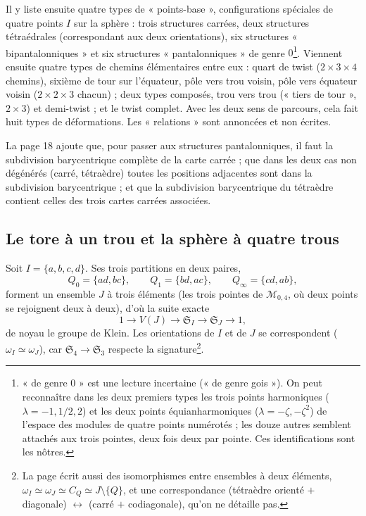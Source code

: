\documentclass[11pt,a4paper]{article}
\begin{document}
Il y liste ensuite quatre types de « points-base », configurations
spéciales de quatre points $I$ sur la sphère : trois structures carrées, deux
structures tétraédrales (correspondant aux deux orientations), six structures
« bipantalonniques » et six structures « pantalonniques » de genre
$0$\footnote{« de genre $0$ » est une lecture incertaine (« de genre gois »).
On peut reconnaître dans les deux premiers types les trois points harmoniques
($\lambda = -1, 1/2, 2$) et les deux points équianharmoniques ($\lambda = -\zeta,
-\zeta^2$) de l'espace des modules de quatre points numérotés ; les douze autres
semblent attachés aux trois pointes, deux fois deux par pointe. Ces
identifications sont les nôtres.}. Viennent ensuite quatre types de chemins élémentaires
entre eux : quart de twist ($2 \times 3 \times 4$ chemins), sixième de tour sur
l'équateur, pôle vers trou voisin, pôle vers équateur voisin ($2 \times 2 \times
3$ chacun) ; deux types composés, trou vers trou (« tiers de tour », $2 \times
3$) et demi-twist ; et le twist complet. Avec les deux sens de parcours, cela
fait huit types de déformations. Les « relations » sont annoncées et non
écrites.

La page 18 ajoute que, pour passer aux structures pantalonniques, il faut la
subdivision barycentrique complète de la carte carrée ; que dans les deux cas
non dégénérés (carré, tétraèdre) toutes les positions adjacentes sont dans la
subdivision barycentrique ; et que la subdivision barycentrique du tétraèdre
contient celles des trois cartes carrées associées.

\subsection*{Le tore à un trou et la sphère à quatre trous}

Soit $I = \{a, b, c, d\}$. Ses trois partitions en deux paires,
\[
Q_0 = \{ad, bc\}, \qquad Q_1 = \{bd, ac\}, \qquad Q_\infty = \{cd, ab\},
\]
forment un ensemble $J$ à trois éléments (les trois pointes de
$\mathcal{M}_{0,4}$, où deux points se rejoignent deux à deux), d'où la suite
exacte
\[
1 \to V(J) \to \mathfrak{S}_I \to \mathfrak{S}_J \to 1,
\]
de noyau le groupe de Klein. Les orientations de $I$ et de $J$ se correspondent
($\omega_I \simeq \omega_J$), car $\mathfrak{S}_4 \to \mathfrak{S}_3$ respecte
la signature\footnote{La page écrit aussi des isomorphismes entre ensembles à
deux éléments, $\omega_I \simeq \omega_J \simeq C_Q \simeq J \setminus \{Q\}$,
et une correspondance (tétraèdre orienté $+$ diagonale) $\leftrightarrow$ (carré
$+$ codiagonale), qu'on ne détaille pas.}.
\end{document}
